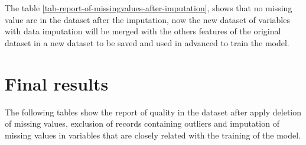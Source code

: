 \documentclass[]{book}
\begin{document}
The table \ref{tab-report-of-missingvalues-after-imputation}, shows that
no missing value are in the dataset after the imputation, now the new
dataset of variables with data imputation will be merged with the others
features of the original dataset in a new dataset to be saved and used
in advanced to train the model.

\section{Final results}\label{final-results}

The following tables show the report of quality in the dataset after
apply deletion of missing values, exclusion of records containing
outliers and imputation of missing values in variables that are closely
related with the training of the model.
\end{document}
